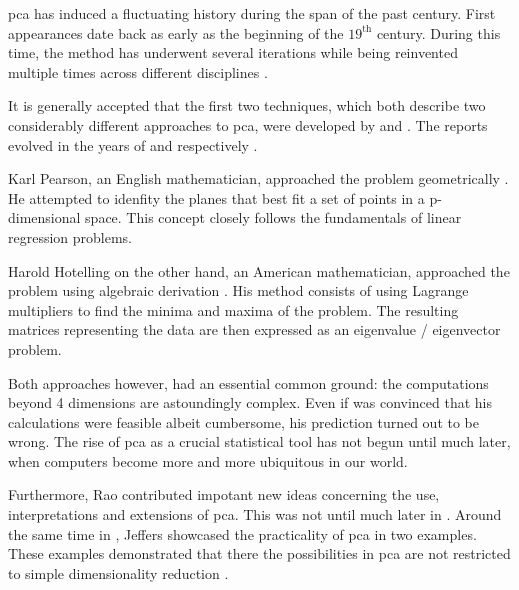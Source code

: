 \Gls{pca} has induced a fluctuating history during the span of the past century.
First appearances date back as early as the beginning of the $19^{\text{th}}$ century. 
During this time, the method has underwent several iterations while being reinvented multiple times across different disciplines \cite{jolliffe2016principal}.\bigskip


It is generally accepted that the first two techniques, which both describe two considerably different approaches to \gls{pca}, were developed by \citeauthor{pearson1901liii} and \citeauthor{hotelling1933analysis}. 
The reports evolved in the years of \citeyear{pearson1901liii} and \citeyear{hotelling1933analysis} respectively \cite{Jolliffe2002book}.

Karl Pearson, an English mathematician, approached the problem geometrically \cite{pearson1901liii}.
He attempted to idenfity the planes that best fit a set of points in a p-dimensional space.
This concept closely follows the fundamentals of linear regression problems.

Harold Hotelling on the other hand, an American mathematician, approached the problem using algebraic derivation \cite{hotelling1933analysis}.
His method consists of using Lagrange multipliers to find the minima and maxima of the problem.
The resulting matrices representing the data are then expressed as an eigenvalue / eigenvector problem.\medskip


Both approaches however, had an essential common ground: the computations beyond 4 dimensions are astoundingly complex.
Even if \citeauthor{pearson1901liii} was convinced that his calculations were feasible albeit cumbersome, his prediction turned out to be wrong.
The rise of \gls{pca} as a crucial statistical tool has not begun until much later, when computers become more and more ubiquitous in our world.\bigskip


Furthermore, Rao \cite{rao1964use} contributed impotant new ideas concerning the use, interpretations and extensions of \gls{pca}.
This was not until much later in \citeyear{rao1964use}.
Around the same time in \citeyear{jeffers1967two}, Jeffers \cite{jeffers1967two} showcased the practicality of \gls{pca} in two examples. 
These examples demonstrated that there the possibilities in \gls{pca} are not restricted to simple dimensionality reduction \cite{Jolliffe2002book}.



